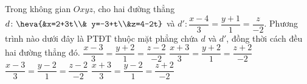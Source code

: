 \begin{ex}%
	Trong không gian $Oxyz$, cho hai đường thẳng $d\colon \heva{&x=2+3t\\& y=-3+t\\&z=4-2t}$ và $d'\colon \dfrac{x-4}{3}=\dfrac{y+1}{1}=\dfrac{z}{-2}$. Phương trình nào dưới đây là PTĐT thuộc mặt phẳng chứa $d$ và $d'$, đồng thời cách đều hai đường thẳng đó.
	\choice
	{\True  $\dfrac{x-3}{3}=\dfrac{y+2}{1}=\dfrac{z-2}{-2}$}
	{$\dfrac{x+3}{3}=\dfrac{y+2}{1}=\dfrac{z+2}{-2}$}
	{$\dfrac{x-3}{3}=\dfrac{y-2}{1}=\dfrac{z-2}{-2}$}
	{$\dfrac{x+3}{3}=\dfrac{y-2}{1}=\dfrac{z+2}{-2}$}
\end{ex}

%
%
%
